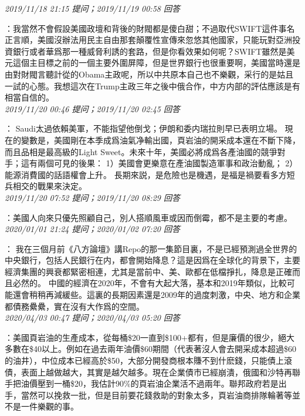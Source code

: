 \documentclass[twocolumn]{ctexart}
\begin{document}
\textit{\hfill\noindent\small 2019/11/18 21:15 提问；2019/11/19 00:58 回答}

：我當然不會假設美國政壇和背後的財閥都是傻白甜；不過取代SWIFT這件事名正言順，美國沒辦法用民主自由那套顛覆性宣傳來忽悠其他國家，只能玩對亞洲投資銀行或者華爲那一種威脅利誘的套路，但是你看效果如何呢？SWIFT雖然是美元這個主目標之前的一個主要外圍屏障，但是世界銀行也很重要啊，美國當時還是由對財閥言聽計從的Obama主政呢，所以中共原本自己也不樂觀，采行的是姑且一試的心態。我想這次在Trump主政三年之後中俄合作，中方内部的評估應該是有相當自信的。
\\

\textit{\hfill\noindent\small 2019/11/20 00:46 提问；2019/11/20 02:45 回答}

：
Saudi太過依賴美軍，不能指望他倒戈；伊朗和委内瑞拉則早已表明立場。
現在的變數是，美國剛在本季成爲油氣净輸出國，頁岩油的開采成本還在不斷下降，而且品相是最高級的Light Sweet。未來十年，美國必將成爲各產油國的競爭對手；這有兩個可見的後果：
1）美國會更樂意在產油國製造軍事和政治動亂；
2）能源消費國的話語權會上升。
長期來説，是危險也是機遇，是福是禍要看多方短兵相交的戰果來決定。
\\

\textit{\hfill\noindent\small 2019/11/20 07:52 提问；2019/11/20 08:29 回答}

：美國人向來只優先照顧自己，別人搭順風車或因而倒霉，都不是主要的考慮。
\\

\textit{\hfill\noindent\small 2020/01/01 21:24 提问；2020/01/02 07:20 回答}

：
我在三個月前《八方論壇》講Repo的那一集節目裏，不是已經預測過全世界的中央銀行，包括人民銀行在内，都會開始降息？這是因爲在全球化的背景下，主要經濟集團的興衰都緊密相連，尤其是當前中、美、歐都在低檔掙扎，降息是正確而且必然的。
中國的經濟在2020年，不會有大起大落，基本和2019年類似，比較可能還會稍稍再減緩些。這裏的長期因素還是2009年的過度刺激，中央、地方和企業都債務纍纍，實在沒有大作爲的空間。
\\

\textit{\hfill\noindent\small 2020/04/03 00:47 提问；2020/04/03 05:20 回答}

：美國頁岩油的生產成本，從每桶\$20一直到\$100+都有，但是廉價的很少，絕大多數在\$40以上。例如在過去兩年油價\$60期間（代表著沒人會去開采成本超過\$60的油井），中位成本已經高於\$50，大部分開發商根本賺不到什麽錢，只能債上滾債，表面上越做越大，其實是越欠越多。現在企業債市已經崩潰，俄國和沙特再聯手把油價壓到一桶\$20，我估計90\%的頁岩油企業活不過兩年。聯邦政府若是出手，當然可以挽救一批，但是目前要花錢救助的對象太多，頁岩油商排隊輪著等並不是一件樂觀的事。
\\
\end{document}
